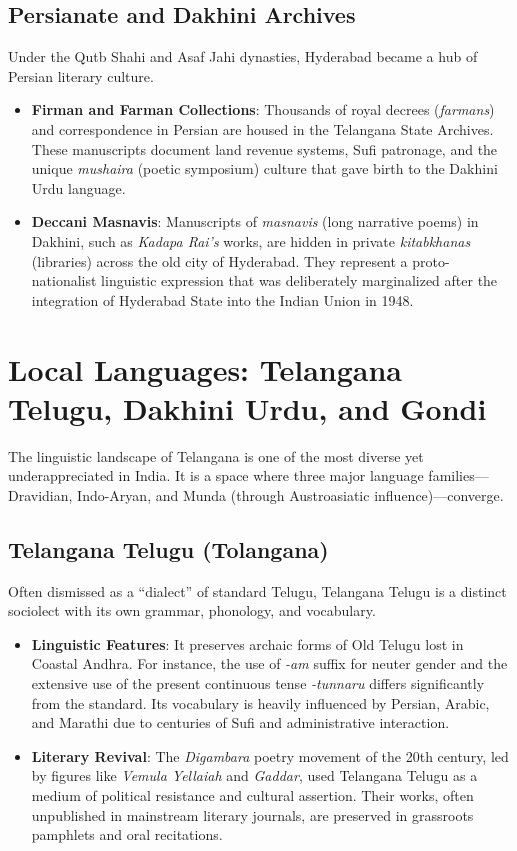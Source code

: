 \documentclass[12pt]{article}
\begin{document}
\subsection{Persianate and Dakhini Archives}
Under the Qutb Shahi and Asaf Jahi dynasties, Hyderabad became a hub of Persian literary culture. 
\begin{itemize}
    \item \textbf{Firman and Farman Collections}: Thousands of royal decrees (\textit{farmans}) and correspondence in Persian are housed in the Telangana State Archives. These manuscripts document land revenue systems, Sufi patronage, and the unique \textit{mushaira} (poetic symposium) culture that gave birth to the Dakhini Urdu language.
    \item \textbf{Deccani Masnavis}: Manuscripts of \textit{masnavis} (long narrative poems) in Dakhini, such as \textit{Kadapa Rai’s} works, are hidden in private \textit{kitabkhanas} (libraries) across the old city of Hyderabad. They represent a proto-nationalist linguistic expression that was deliberately marginalized after the integration of Hyderabad State into the Indian Union in 1948.
\end{itemize}

\section{Local Languages: Telangana Telugu, Dakhini Urdu, and Gondi}
The linguistic landscape of Telangana is one of the most diverse yet underappreciated in India. It is a space where three major language families—Dravidian, Indo-Aryan, and Munda (through Austroasiatic influence)—converge.

\subsection{Telangana Telugu (Tolangana)}
Often dismissed as a “dialect” of standard Telugu, Telangana Telugu is a distinct sociolect with its own grammar, phonology, and vocabulary.
\begin{itemize}
    \item \textbf{Linguistic Features}: It preserves archaic forms of Old Telugu lost in Coastal Andhra. For instance, the use of \textit{-am} suffix for neuter gender and the extensive use of the present continuous tense \textit{-tunnaru} differs significantly from the standard. Its vocabulary is heavily influenced by Persian, Arabic, and Marathi due to centuries of Sufi and administrative interaction.
    \item \textbf{Literary Revival}: The \textit{Digambara} poetry movement of the 20th century, led by figures like \textit{Vemula Yellaiah} and \textit{Gaddar}, used Telangana Telugu as a medium of political resistance and cultural assertion. Their works, often unpublished in mainstream literary journals, are preserved in grassroots pamphlets and oral recitations. \cite{teguvada}
\end{itemize}
\end{document}
